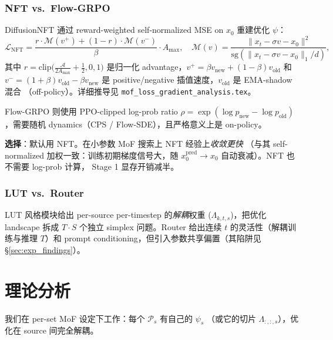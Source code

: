\documentclass[11pt,a4paper]{article}
\newcommand{\loss}{\mathcal{L}}
\theoremstyle{definition}
\begin{document}
\subsubsection{NFT vs.\ Flow-GRPO}
\label{ssec:nft_choice}

DiffusionNFT 通过 reward-weighted self-normalized MSE on $x_0$
重建优化 $\psi$：
\begin{equation}
\loss_{\text{NFT}} = \frac{r\cdot\mathcal{M}(v^+) + (1-r)\cdot\mathcal{M}(v^-)}{\beta}\cdot A_{\max},\quad
\mathcal{M}(v) = \frac{\|x_t-\sigma v - x_0\|^2}{\mathrm{sg}(\|x_t-\sigma v - x_0\|_1/d)},
\label{eq:nft}
\end{equation}
其中 $r = \mathrm{clip}\big(\tfrac{\mathcal{A}}{2 A_{\max}}+\tfrac{1}{2},0,1\big)$
是归一化 advantage，$v^+ = \beta v_{\text{new}} + (1-\beta) v_{\text{old}}$
和 $v^- = (1+\beta) v_{\text{old}} - \beta v_{\text{new}}$ 是
positive/negative 插值速度，$v_{\text{old}}$ 是 EMA-shadow 混合
（off-policy）。详细推导见 \texttt{mof\_loss\_gradient\_analysis.tex}。

Flow-GRPO 则使用 PPO-clipped log-prob ratio
$\rho = \exp(\log p_{\text{new}} - \log p_{\text{old}})$，需要随机
dynamics（CPS / Flow-SDE），且严格意义上是 on-policy。

\textbf{选择}：默认用 NFT。在小参数 MoF 搜索上 NFT 经验上\emph{收敛更快}
（与其 self-normalized 加权一致：训练初期梯度信号大，随
$x_0^{\text{pred}} \to x_0$ 自动衰减）。NFT 也不需要 log-prob 计算，
Stage 1 显存开销减半。

\subsubsection{LUT vs.\ Router}

LUT 风格模块给出 per-source per-timestep 的\emph{解耦}权重
($\Lambda_{k,t,s}$)，把优化 landscape 拆成 $T \cdot S$ 个独立 simplex
问题。Router 给出连续 $t$ 的灵活性（解耦训练与推理 $T$）和 prompt
conditioning，但引入参数共享偏置（其陷阱见 \S\ref{sec:exp_findings}）。

\section{理论分析}
\label{sec:theory}

我们在 per-set MoF 设定下工作：每个 $\mathcal{P}_s$ 有自己的 $\psi_s$
（或它的切片 $\Lambda_{:, :, s}$），优化在 source 间完全解耦。
\end{document}
